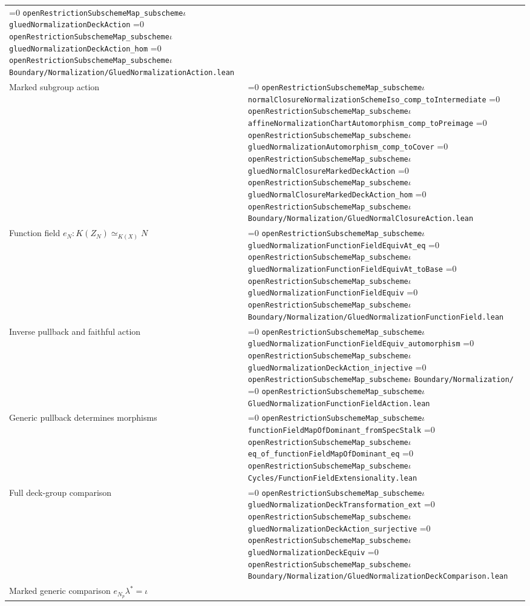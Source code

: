 \documentclass[11pt]{article}
\theoremstyle{definition}
\theoremstyle{remark}
\newcommand{\leanpath}[1]{%
  \ifnum\pdfstrcmp{\detokenize{#1}}%
      {\detokenize{openRestrictionSubschemeMap_subschemeι}}=0
    \texttt{\nolinkurl{openRestrictionSubschemeMap_subscheme}}\ensuremath{\iota}%
  \else
    \texttt{\nolinkurl{#1}}%
  \fi}
\begin{document}
\begin{longtable}{@{}>{\raggedright\arraybackslash}p{}
                >{\raggedright\arraybackslash}p{}@{}}
\leanpath{gluedNormalizationDeckAction}\newline
\leanpath{gluedNormalizationDeckAction_hom}\newline
\leanpath{Boundary/Normalization/GluedNormalizationAction.lean}\\
Marked subgroup action &
\leanpath{normalClosureNormalizationSchemeIso_comp_toIntermediate}\newline
\leanpath{affineNormalizationChartAutomorphism_comp_toPreimage}\newline
\leanpath{gluedNormalizationAutomorphism_comp_toCover}\newline
\leanpath{gluedNormalClosureMarkedDeckAction}\newline
\leanpath{gluedNormalClosureMarkedDeckAction_hom}\newline
\leanpath{Boundary/Normalization/GluedNormalClosureAction.lean}\\
Function field \(e_N:K(Z_N)\simeq_{K(X)}N\) &
\leanpath{gluedNormalizationFunctionFieldEquivAt_eq}\newline
\leanpath{gluedNormalizationFunctionFieldEquivAt_toBase}\newline
\leanpath{gluedNormalizationFunctionFieldEquiv}\newline
\leanpath{Boundary/Normalization/GluedNormalizationFunctionField.lean}\\
Inverse pullback and faithful action &
\leanpath{gluedNormalizationFunctionFieldEquiv_automorphism}\newline
\leanpath{gluedNormalizationDeckAction_injective}\newline
\leanpath{Boundary/Normalization/}\newline
\leanpath{GluedNormalizationFunctionFieldAction.lean}\\
Generic pullback determines morphisms &
\leanpath{functionFieldMapOfDominant_fromSpecStalk}\newline
\leanpath{eq_of_functionFieldMapOfDominant_eq}\newline
\leanpath{Cycles/FunctionFieldExtensionality.lean}\\
Full deck-group comparison &
\leanpath{gluedNormalizationDeckTransformation_ext}\newline
\leanpath{gluedNormalizationDeckAction_surjective}\newline
\leanpath{gluedNormalizationDeckEquiv}\newline
\leanpath{Boundary/Normalization/GluedNormalizationDeckComparison.lean}\\
Marked generic comparison \(e_{N_p}\lambda^*=\iota\) &

\end{longtable}
\end{document}
